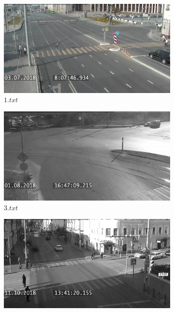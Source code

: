 \begin{figure}[!htb]
	\centering
	\begin{subfigure}[!htb]{0.23\textwidth}
		\centering{}
		\includegraphics[width=\textwidth]{images/is-1.jpg}
		\caption{$1.txt$}
		\label{fig:is_1}
	\end{subfigure}
	\hfill
	\begin{subfigure}[!htb]{0.23\textwidth}
		\centering{}
		\includegraphics[width=\textwidth]{images/is-2.jpg}
		\caption{$3.txt$}
		\label{fig:is_2}
	\end{subfigure}
	\hfill
	\begin{subfigure}[!htb]{0.23\textwidth}
		\centering{}
		\includegraphics[width=\textwidth]{images/is-3.jpg}

\end{subfigure}
\end{figure}
